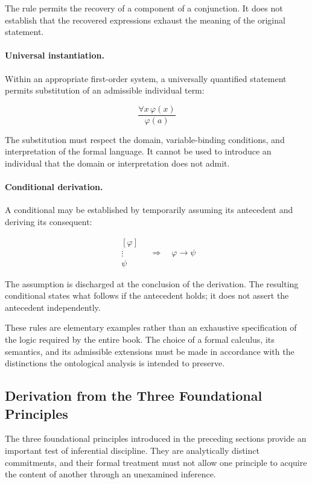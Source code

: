 The rule permits the recovery of a component of a conjunction.
It does not establish that the recovered expressions exhaust the
meaning of the original statement.

\paragraph{Universal instantiation.}

Within an appropriate first-order system, a universally quantified
statement permits substitution of an admissible individual term:

\[
\frac{\forall x\,\varphi(x)}
     {\varphi(a)}
\]

The substitution must respect the domain, variable-binding
conditions, and interpretation of the formal language. It cannot
be used to introduce an individual that the domain or interpretation
does not admit.

\paragraph{Conditional derivation.}

A conditional may be established by temporarily assuming its
antecedent and deriving its consequent:

\[
\begin{array}{c}
    [\varphi] \\
    \vdots \\
    \psi
\end{array}
\quad
\Longrightarrow
\quad
\varphi \rightarrow \psi
\]

The assumption is discharged at the conclusion of the derivation.
The resulting conditional states what follows if the antecedent
holds; it does not assert the antecedent independently.

These rules are elementary examples rather than an exhaustive
specification of the logic required by the entire book. The choice
of a formal calculus, its semantics, and its admissible extensions
must be made in accordance with the distinctions the ontological
analysis is intended to preserve.

\subsection{Derivation from the Three Foundational Principles}

The three foundational principles introduced in the preceding
sections provide an important test of inferential discipline. They
are analytically distinct commitments, and their formal treatment
must not allow one principle to acquire the content of another
through an unexamined inference.

